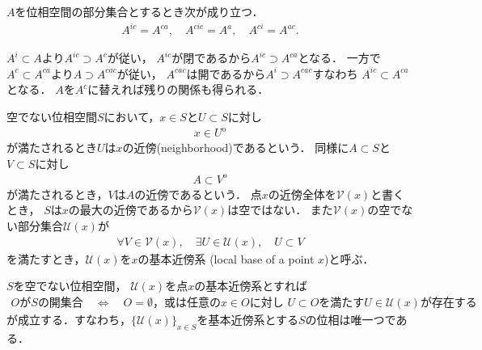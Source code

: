 	\begin{screen}
		\begin{thm}[内部の補集合は補集合の閉包]
		\label{thm:topology_note_closure_interior}
			$A$を位相空間の部分集合とするとき次が成り立つ．
			\begin{align}
				A^{ic} = A^{ca},
				\quad A^{cic} = A^a,
				\quad A^{ci} = A^{ac}.
			\end{align}
		\end{thm}
	\end{screen}
	
	\begin{prf}
		$A^i \subset A$より$A^{ic} \supset A^c$が従い，
		$A^{ic}$が閉であるから$A^{ic} \supset A^{ca}$となる．
		一方で$A^c \subset A^{ca}$より$A \supset A^{cac}$が従い，
		$A^{cac}$は開であるから$A^i \supset A^{cac}$すなわち
		$A^{ic} \subset A^{ca}$となる．
		$A$を$A^c$に替えれば残りの関係も得られる．
		\QED
	\end{prf}
	
	\begin{screen}
		\begin{dfn}[近傍・基本近傍系]
			空でない位相空間$S$において，$x \in S$と$U \subset S$に対し
			\begin{align}
				x \in U^{\mathrm{o}}
			\end{align}
			が満たされるとき$U$は$x$の近傍(neighborhood)であるという．
			同様に$A \subset S$と$V \subset S$に対し
			\begin{align}
				A \subset V^{\mathrm{o}}
			\end{align}
			が満たされるとき，$V$は$A$の近傍であるという．
			点$x$の近傍全体を$\mathscr{V}(x)$と書くとき，
			$S$は$x$の最大の近傍であるから$\mathscr{V}(x)$は空ではない．
			また$\mathscr{V}(x)$の空でない部分集合$\mathscr{U}(x)$が
			\begin{align}
				\forall V \in \mathscr{V}(x),
				\quad \exists U \in \mathscr{U}(x),
				\quad U \subset V
			\end{align}
			を満たすとき，$\mathscr{U}(x)$を$x$の基本近傍系
			(local base of a point $x$)と呼ぶ．
		\end{dfn}
	\end{screen}
	
	\begin{screen}
		\begin{thm}[基本近傍系は開集合を決定する]\label{thm:local_base_defines_open_sets}
			$S$を空でない位相空間，
			$\mathscr{U}(x)$を点$x$の基本近傍系とすれば
			\begin{align}
				\mbox{$O$が$S$の開集合} \quad \Longleftrightarrow \quad 
				\mbox{$O = \emptyset$，或は任意の$x \in O$に対し
				$U \subset O$を満たす$U \in \mathscr{U}(x)$が存在する}
			\end{align}
			が成立する．すなわち，$\{\mathscr{U}(x)\}_{x \in S}$を基本近傍系とする$S$の位相は唯一つである．
		\end{thm}
	\end{screen}
	
